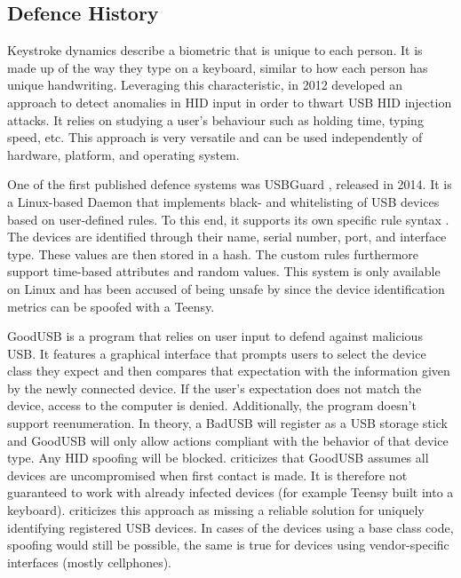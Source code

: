 \subsection{Defence History} \label{defence_history}


Keystroke dynamics describe a biometric that is unique to each person. It is made up of the way they type on a keyboard, similar to how each person has unique handwriting. Leveraging this characteristic,  in 2012 \cite{barbhuiyaAnomalyBasedApproach2012} developed an approach to detect anomalies in HID input in order to thwart USB HID injection attacks. It relies on studying a user's behaviour such as holding time, typing speed, etc. This approach is very versatile and can be used independently of hardware, platform, and operating system. 

One of the first published defence systems was USBGuard \cite{HomeUSBGuard}, released in 2014. It is a Linux-based Daemon that implements black- and whitelisting of USB devices based on user-defined rules. To this end, it supports its own specific rule syntax \cite{RuleLanguageUSBGuard}. The devices are identified through their name, serial number, port, and interface type. These values are then stored in a hash. The custom rules furthermore support time-based attributes and random values. This system is only available on Linux and has been accused of being unsafe by \cite{farhiMalboardNovelUser2019} since the device identification metrics can be spoofed with a Teensy. 

GoodUSB \cite{tianDefendingMaliciousUSB2015} is a program that relies on user input to defend against malicious USB. It features a graphical interface that prompts users to select the device class they expect and then compares that expectation with the information given by the newly connected device. If the user's expectation does not match the device, access to the computer is denied. Additionally, the program doesn't support reenumeration. In theory, a BadUSB will register as a USB storage stick and GoodUSB will only allow actions compliant with the behavior of that device type. Any HID spoofing will be blocked. 
\cite{nissimUSBbasedAttacks2017} criticizes that GoodUSB assumes all devices are uncompromised when first contact is made. It is therefore not guaranteed to work with already infected devices (for example Teensy built into a keyboard). 
\cite{mohammadmoradiMakingWhitelistingBaseddefence2018} criticizes this approach as missing a reliable solution for uniquely identifying registered USB devices. In cases of the devices using a base class code, spoofing would still be possible, the same is true for devices using vendor-specific interfaces (mostly cellphones). 

